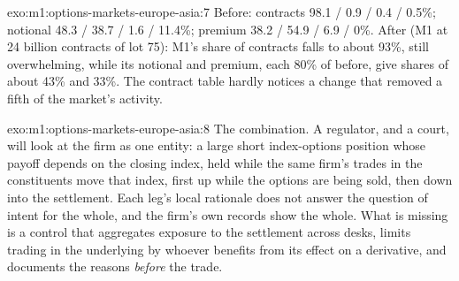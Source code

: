 \begin{solution}{exo:m1:options-markets-europe-asia:7}
Before: contracts 98.1 / 0.9 / 0.4 / 0.5\%; notional 48.3 / 38.7 / 1.6 /
11.4\%; premium 38.2 / 54.9 / 6.9 / 0\%. After (M1 at 24 billion contracts of
lot 75): M1's share of contracts falls to about 93\%, still overwhelming,
while its notional and premium, each 80\% of before, give shares of about 43\%
and 33\%. The contract table hardly notices a change that removed a fifth of
the market's activity.
\end{solution}

\begin{solution}{exo:m1:options-markets-europe-asia:8}
The combination. A regulator, and a court, will look at the firm as one
entity: a large short index-options position whose payoff depends on the
closing index, held while the same firm's trades in the constituents move
that index, first up while the options are being sold, then down into the
settlement. Each leg's local rationale does not answer the question of
intent for the whole, and the firm's own records show the whole. What is
missing is a control that aggregates exposure to the settlement across
desks, limits trading in the underlying by whoever benefits from its effect
on a derivative, and documents the reasons \emph{before} the trade.
\end{solution}

